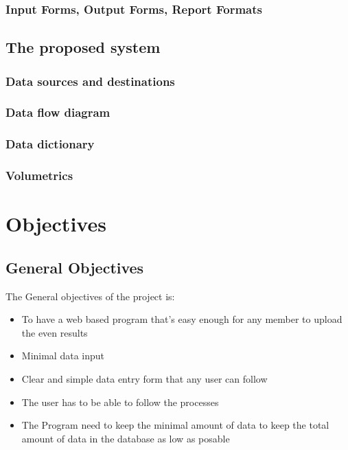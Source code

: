 \subsubsection{Input Forms, Output Forms, Report Formats}

\subsection{The proposed system}

\subsubsection{Data sources and destinations}

\subsubsection{Data flow diagram}

\subsubsection{Data dictionary}

\subsubsection{Volumetrics}

\section{Objectives}

\subsection{General Objectives}
The General objectives of the project is:
\begin{itemize}
	\item To have a web based program that's easy enough for any member to upload the even results
	\item Minimal data input
	\item Clear and simple data entry form that any user can follow
	\item The user has to be able to follow the processes
	\item The Program need to keep the minimal amount of data to keep the total amount of data in the database as low as posable
\end{itemize}

